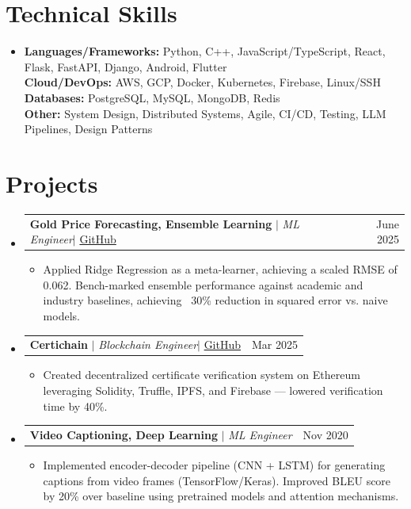 \documentclass[letterpaper,11pt]{article}
\makeatletter
\newcommand{\resumeItem}[1]{
  \item\small{#1 \vspace{-4pt}}
}
\newcommand{\resumeProjectHeading}[2]{
  \item
    \begin{tabular*}{0.97\textwidth}{l@{\extracolsep{\fill}}r}
      \small#1 & #2 \\
    \end{tabular*}\vspace{-4pt}
}
\newcommand{\resumeSubHeadingListStart}{
  \begin{itemize}[leftmargin=0.0in, label={}]
    \setlength{\parskip}{0pt}
}
\newcommand{\resumeSubHeadingListEnd}{
  \end{itemize}
}
\newcommand{\resumeItemListStart}{
  \begin{itemize}[leftmargin=0.15in, labelsep=0.05in]
}
\newcommand{\resumeItemListEnd}{
  \end{itemize}\vspace{-4pt}
}
\makeatother
\begin{document}
\vspace{-4pt}
\section{Technical Skills}
\begin{itemize}[leftmargin=0.0in, label={}] 
\small \item{ \vspace{5pt} 
\textbf{Languages/Frameworks:} Python, C++, JavaScript/TypeScript, React, Flask, FastAPI, Django, Android, Flutter \\ 
\textbf{Cloud/DevOps:} AWS, GCP, Docker, Kubernetes, Firebase, Linux/SSH \\ 
\textbf{Databases:} PostgreSQL, MySQL, MongoDB, Redis \\ \textbf{Other:} System Design, Distributed Systems, Agile, CI/CD, Testing, LLM Pipelines, Design Patterns }
\end{itemize}\vspace{-4pt}

\vspace{-4pt}
\section{Projects}
\resumeSubHeadingListStart
  \resumeProjectHeading{\textbf{Gold Price Forecasting, Ensemble Learning} $|$ \emph{ML Engineer}$|$ \href{https://github.com/abhin2149/gold_price_prediction_ensemble}{GitHub}}{June 2025}
  \resumeItemListStart
    \resumeItem{Applied Ridge Regression as a meta-learner, achieving a scaled RMSE of 0.062. Bench-marked ensemble performance against academic and industry baselines, achieving ~30\% reduction in squared error vs. naive models.}
  \resumeItemListEnd
  \resumeProjectHeading{\textbf{Certichain} $|$ \emph{Blockchain Engineer}$|$ \href{https://github.com/abhin2149/certichain}{GitHub}}{Mar 2025}
  \resumeItemListStart
    \resumeItem{Created decentralized certificate verification system on Ethereum leveraging Solidity, Truffle, IPFS, and Firebase — lowered verification time by 40\%.}
  \resumeItemListEnd

  \resumeProjectHeading{\textbf{Video Captioning, Deep Learning} $|$ \emph{ML Engineer}}{Nov 2020}
  \resumeItemListStart
    \resumeItem{Implemented encoder-decoder pipeline (CNN + LSTM) for generating captions from video frames (TensorFlow/Keras). Improved BLEU score by 20\% over baseline using pretrained models and attention mechanisms.}
  \resumeItemListEnd
\resumeSubHeadingListEnd
\end{document}
